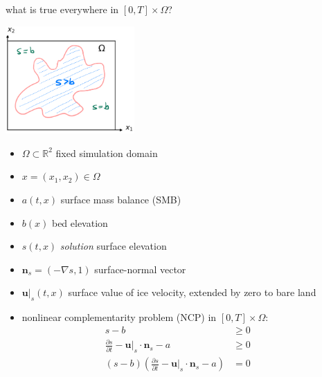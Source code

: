 \documentclass[10pt,svgnames]{beamer}
\newcommand{\bn}{\mathbf{n}}
\newcommand{\bu}{\mathbf{u}}
\newcommand{\RR}{\mathbb{R}}
\newcommand{\grad}{\nabla}
\begin{document}
\begin{frame}{what is true everywhere in $[0,T]\times\Omega$?}

\hfill \includegraphics[width=0.37\textwidth]{mapplane}

\vspace{-40mm}

\begin{minipage}[t]{60mm}
{\small
\begin{itemize}
\item $\Omega \subset \RR^2$ fixed simulation domain
\item $x = (x_1,x_2) \in \Omega$
\item $a(t,x)$ surface mass balance (SMB)
\item $b(x)$ bed elevation
\item $s(t,x)$ \emph{solution} surface elevation
\item $\bn_s = (- \grad s,1)$ surface-normal vector
\item $\bu|_s(t,x)$ surface value of ice velocity, extended by zero to bare land
\end{itemize}
}
\end{minipage}

\begin{itemize}
\item nonlinear complementarity problem (NCP) in $[0,T] \times \Omega$:
\begin{align*}
s - b &\ge 0 &&\phantom{x} \\
\frac{\partial s}{\partial t} - \bu|_s \cdot \bn_s - a &\ge 0 \\
(s - b) \left(\frac{\partial s}{\partial t} - \bu|_s \cdot \bn_s - a\right) &= 0
\end{align*}
\end{itemize}
\end{frame}
\end{document}
